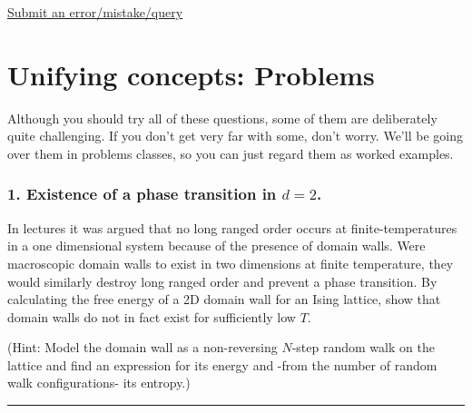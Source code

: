 \documentclass[
  letterpaper,
  enabledeprecatedfontcommands]{report}
\begin{document}
\begin{tcolorbox}[enhanced jigsaw, breakable, colback=white, colframe=quarto-callout-note-color-frame, bottomrule=.15mm, leftrule=.75mm, toprule=.15mm, opacityback=0, arc=.35mm, rightrule=.15mm, left=2mm]

\href{https://forms.office.com/e/6uL2Bd5QGq}{Submit an
error/mistake/query}

\end{tcolorbox}


\chapter*{Unifying concepts: Problems}\label{problems}


Although you should try all of these questions, some of them are
deliberately quite challenging. If you don't get very far with some,
don't worry. We'll be going over them in problems classes, so you can
just regard them as worked examples.

\subsection*{\texorpdfstring{1. Existence of a phase transition in
\(d=2\).}{1. Existence of a phase transition in d=2.}}\label{existence-of-a-phase-transition-in-d2.}

In lectures it was argued that no long ranged order occurs at
finite-temperatures in a one dimensional system because of the presence
of domain walls. Were macroscopic domain walls to exist in two
dimensions at finite temperature, they would similarly destroy long
ranged order and prevent a phase transition. By calculating the free
energy of a 2D domain wall for an Ising lattice, show that domain walls
do not in fact exist for sufficiently low \(T\).

(Hint: Model the domain wall as a non-reversing \(N\)-step random walk
on the lattice and find an expression for its energy and -from the
number of random walk configurations- its entropy.)

\begin{center}\rule{0.5\linewidth}{0.5pt}\end{center}
\end{document}

